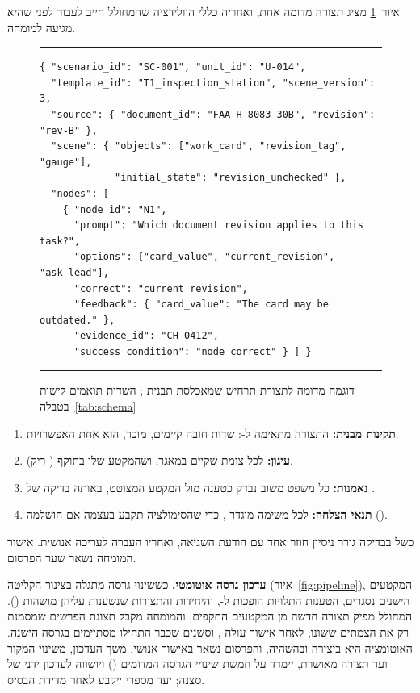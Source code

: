 איור~\ref{fig:json} מציג תצורה מדומה אחת, ואחריה כללי הוולידציה שהמחולל חייב לעבור לפני שהיא מגיעה למומחה.
\begin{figure}[!htbp]
\centering
\begin{english}\begin{minipage}{11.6cm}
\hrule\vspace{3pt}
\fontsize{7.6}{9.2}\selectfont
\begin{verbatim}
{ "scenario_id": "SC-001", "unit_id": "U-014",
  "template_id": "T1_inspection_station", "scene_version": 3,
  "source": { "document_id": "FAA-H-8083-30B", "revision": "rev-B" },
  "scene": { "objects": ["work_card", "revision_tag", "gauge"],
             "initial_state": "revision_unchecked" },
  "nodes": [
    { "node_id": "N1",
      "prompt": "Which document revision applies to this task?",
      "options": ["card_value", "current_revision", "ask_lead"],
      "correct": "current_revision",
      "feedback": { "card_value": "The card may be outdated." },
      "evidence_id": "CH-0412",
      "success_condition": "node_correct" } ] }
\end{verbatim}
\vspace{1pt}\hrule
\end{minipage}\end{english}
\caption{דוגמה מדומה לתצורת תרחיש  שמאכלסת תבנית \threeD{}; השדות תואמים לישות \texttt{} בטבלה~\ref{tab:schema}}\label{fig:json}
\end{figure}
\begin{enumerate}
  \item \textbf{תקינות מבנית:} התצורה מתאימה ל-: שדות חובה קיימים, \texttt{} מוכר, \texttt{} הוא אחת האפשרויות.
  \item \textbf{עיגון:} לכל צומת \texttt{} שקיים במאגר, ושהמקטע שלו בתוקף (\texttt{} ריק).
  \item \textbf{נאמנות:} כל משפט משוב נבדק כטענה מול המקטע המצוטט, באותה בדיקה של .
  \item \textbf{תנאי הצלחה:} לכל משימה מוגדר \texttt{}, כדי שהסימולציה תקבע בעצמה אם הושלמה ().
\end{enumerate}
כשל בבדיקה גורר ניסיון חוזר אחד עם הודעת השגיאה, ואחריו העברה לעריכה אנושית. אישור המומחה נשאר שער הפרסום.

\textbf{עדכון גרסה אוטומטי.} כששינוי גרסה מתגלה בצינור הקליטה (איור~\ref{fig:pipeline}), המקטעים הישנים נסגרים, הטענות התלויות הופכות ל-\texttt{}, והיחידות והתצורות
שנשענות עליהן מושהות (). המחולל מפיק תצורה חדשה מן המקטעים התקפים, והמומחה מקבל תצוגת הפרשים שמסמנת רק את הצמתים ששונו; לאחר אישור עולה
\texttt{}, וסשנים שכבר התחילו מסתיימים בגרסה הישנה. האוטומציה היא ביצירה ובהשהיה, והפרסום נשאר באישור אנושי. משך העדכון, משינוי המקור
ועד תצורה מאושרת, יימדד על חמשת שינויי הגרסה המדומים () ויושווה לעדכון ידני של סצנה; יעד מספרי ייקבע לאחר מדידת הבסיס.

